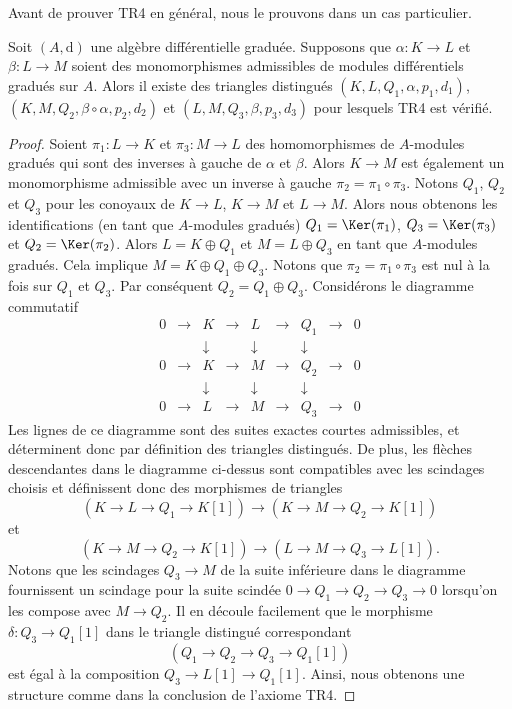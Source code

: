 \noindent
Avant de prouver TR4 en général, nous le prouvons dans un cas particulier.

\begin{lemma}
\label{lemma-two-split-injections}
Soit $(A, \text{d})$ une algèbre différentielle graduée. Supposons que
$\alpha : K \to L$ et $\beta : L \to M$ soient des monomorphismes admissibles
de modules différentiels gradués sur $A$. Alors il existe des triangles distingués
$(K, L, Q_1, \alpha, p_1, d_1)$, $(K, M, Q_2, \beta \circ \alpha, p_2, d_2)$ et $(L,
M, Q_3, \beta, p_3, d_3)$ pour lesquels TR4 est vérifié.
\end{lemma}

\begin{proof}
Soient $\pi_1 : L \to K$ et $\pi_3 : M \to L$ des homomorphismes de
$A$-modules gradués qui sont des inverses à gauche de $\alpha$ et $\beta$.
Alors $K \to M$ est également un monomorphisme admissible avec un
inverse à gauche $\pi_2 = \pi_1 \circ \pi_3$. Notons $Q_1$, $Q_2$ et
$Q_3$ pour les conoyaux de $K \to L$, $K \to M$ et $L \to M$. Alors nous
obtenons les identifications (en tant que $A$-modules gradués)
$Q_1 = \Ker(\pi_1)$, $Q_3 = \Ker(\pi_3)$ et $Q_2 =
\Ker(\pi_2)$. Alors $L = K \oplus Q_1$ et $M = L \oplus
Q_3$ en tant que $A$-modules gradués. Cela implique $M = K
\oplus Q_1 \oplus Q_3$. Notons que $\pi_2 = \pi_1 \circ \pi_3$ est nul à la
fois sur $Q_1$ et $Q_3$. Par conséquent $Q_2 = Q_1 \oplus Q_3$.
Considérons le diagramme commutatif
$$
\begin{matrix}
0 & \to & K & \to & L & \to & Q_1 & \to &
0 \\ & & \downarrow & & \downarrow & & \downarrow & \\ 0 &
\to & K & \to & M & \to & Q_2 & \to & 0
\\ & & \downarrow & & \downarrow & & \downarrow & \\ 0 & \to
& L & \to & M & \to & Q_3 & \to & 0
\end{matrix}
$$
Les lignes de ce diagramme sont des suites exactes courtes admissibles, et
déterminent donc par définition des triangles distingués. De plus, les
flèches descendantes dans le diagramme ci-dessus sont compatibles avec les
scindages choisis et définissent donc des morphismes de triangles
$$
(K \to L \to Q_1 \to K[1])
\longrightarrow
(K \to M \to Q_2 \to K[1])
$$
et
$$
(K \to M \to Q_2 \to K[1])
\longrightarrow
(L \to M \to Q_3 \to L[1]).
$$
Notons que les scindages $Q_3 \to M$ de la suite inférieure dans le
diagramme fournissent un scindage pour la suite
scindée $0 \to Q_1 \to Q_2 \to Q_3 \to 0$ lorsqu'on les compose avec $M
\to Q_2$. Il en découle facilement que le morphisme $\delta : Q_3 \to
Q_1[1]$ dans le triangle distingué correspondant
$$
(Q_1 \to Q_2 \to Q_3 \to Q_1[1])
$$
est égal à la composition $Q_3 \to L[1] \to Q_1[1]$. Ainsi,
nous obtenons une structure comme dans la conclusion de l'axiome TR4.
\end{proof}

